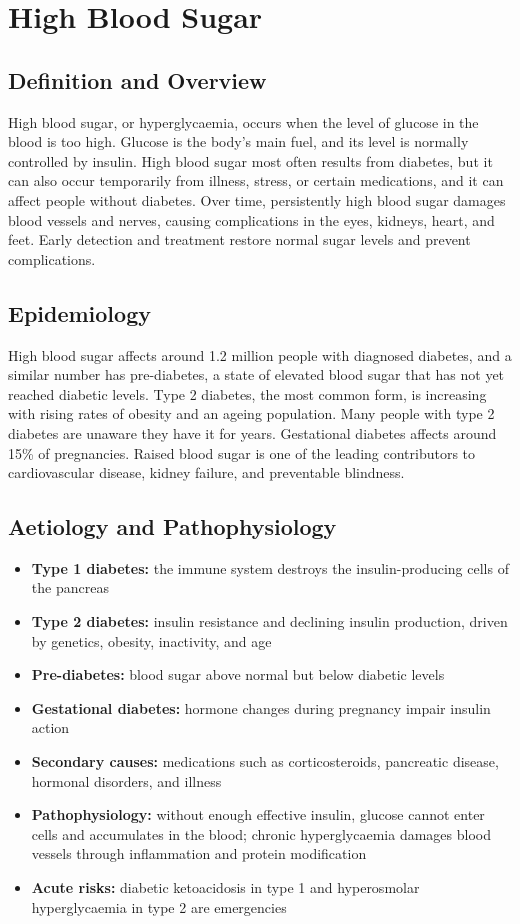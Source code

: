 \chapter{High Blood Sugar}

\section*{Definition and Overview}
High blood sugar, or hyperglycaemia, occurs when the level of glucose in the blood is too high. Glucose is the body's main fuel, and its level is normally controlled by insulin. High blood sugar most often results from diabetes, but it can also occur temporarily from illness, stress, or certain medications, and it can affect people without diabetes. Over time, persistently high blood sugar damages blood vessels and nerves, causing complications in the eyes, kidneys, heart, and feet. Early detection and treatment restore normal sugar levels and prevent complications.

\section*{Epidemiology}
High blood sugar affects around 1.2 million people with diagnosed diabetes, and a similar number has pre-diabetes, a state of elevated blood sugar that has not yet reached diabetic levels. Type 2 diabetes, the most common form, is increasing with rising rates of obesity and an ageing population. Many people with type 2 diabetes are unaware they have it for years. Gestational diabetes affects around 15\% of pregnancies. Raised blood sugar is one of the leading contributors to cardiovascular disease, kidney failure, and preventable blindness.

\section*{Aetiology and Pathophysiology}
\begin{itemize}
    \item \textbf{Type 1 diabetes:} the immune system destroys the insulin-producing cells of the pancreas
    \item \textbf{Type 2 diabetes:} insulin resistance and declining insulin production, driven by genetics, obesity, inactivity, and age
    \item \textbf{Pre-diabetes:} blood sugar above normal but below diabetic levels
    \item \textbf{Gestational diabetes:} hormone changes during pregnancy impair insulin action
    \item \textbf{Secondary causes:} medications such as corticosteroids, pancreatic disease, hormonal disorders, and illness
    \item \textbf{Pathophysiology:} without enough effective insulin, glucose cannot enter cells and accumulates in the blood; chronic hyperglycaemia damages blood vessels through inflammation and protein modification
    \item \textbf{Acute risks:} diabetic ketoacidosis in type 1 and hyperosmolar hyperglycaemia in type 2 are emergencies
\end{itemize}

